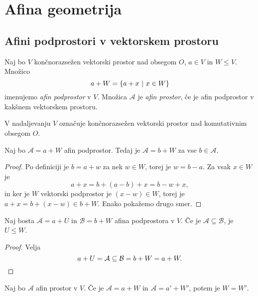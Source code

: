 \section{Afina geometrija}

\subsection{Afini podprostori v vektorskem prostoru}


\begin{definicija}
    Naj bo $V$ končnorazsežen vektorski prostor nad obsegom $O$, $a \in V$ in $W \leq V$. Množico
    \[
    a + W = \left\{a + x~\middle\vert~x \in W\right\}
    \]
    imenujemo \emph{afin podprostor} v $V$.
    Množica $\mathcal{A}$ je \emph{afin prostor}, če je afin podprostor v kakšnem vektorskem prostoru.
\end{definicija}

\begin{opomba}
    V nadaljevanju $V$ označuje končnorazsežen vektorski prostor nad komutativnim obsegom $O$.
\end{opomba}

\begin{lema}
    Naj bo $\mathcal{A} = a + W$ afin podprostor. Tedaj je $\mathcal{A} = b + W$ za vse $b \in \mathcal{A}$.
\end{lema}

\begin{proof}
    Po definiciji je $b = a + w$ za nek $w \in W$, torej je $w = b - a$. Za vsak $x \in W$ je
    \[
    a + x = b + (a - b) + x = b - w + x,
    \]
    in ker je $W$ vektorski podprostor je $(x - w) \in W$, torej je $a + x = b + (x - w) \in b + W$. Enako pokažemo drugo smer.
\end{proof}

\begin{posledica}
    Naj bosta $\mathcal{A} = a + U$ in $\mathcal{B} = b + W$ afina podprostora v $V$. Če je $\mathcal{A} \subseteq \mathcal{B}$, je $U \leq W$.
\end{posledica}

\begin{proof}
	Velja
	\[    
    a + U = \mathcal{A} \subseteq \mathcal{B} = b + W = a + W. \qedhere
    \]
\end{proof}

\begin{posledica}
    Naj bo $\mathcal{A}$ afin prostor v $V$. Če je $\mathcal{A} = a + W$ in $\mathcal{A} = a' + W'$, potem je $W = W'$.
\end{posledica}

